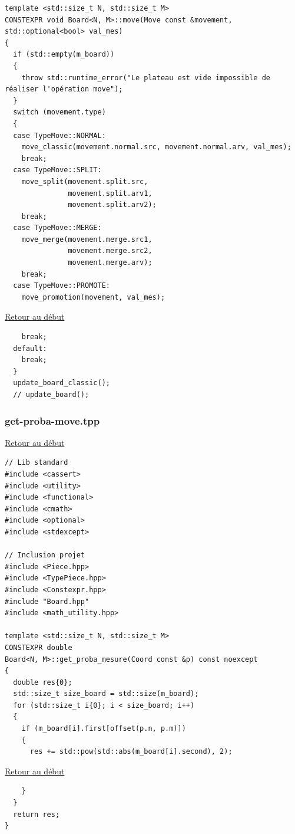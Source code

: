 {\begin{frame}[fragile]
\begin{verbatim}
template <std::size_t N, std::size_t M>
CONSTEXPR void Board<N, M>::move(Move const &movement, std::optional<bool> val_mes)
{
  if (std::empty(m_board))
  {
    throw std::runtime_error("Le plateau est vide impossible de réaliser l'opération move");
  }
  switch (movement.type)
  {
  case TypeMove::NORMAL:
    move_classic(movement.normal.src, movement.normal.arv, val_mes);
    break;
  case TypeMove::SPLIT:
    move_split(movement.split.src,
               movement.split.arv1,
               movement.split.arv2);
    break;
  case TypeMove::MERGE:
    move_merge(movement.merge.src1,
               movement.merge.src2,
               movement.merge.arv);
    break;
  case TypeMove::PROMOTE:
    move_promotion(movement, val_mes);
\end{verbatim}
\end{frame}

\begin{frame}[fragile]
\hyperlink{conclusion}{Retour au début}\newline
\begin{verbatim}
    break;
  default:
    break;
  }
  update_board_classic();
  // update_board();

\end{verbatim}
\end{frame}

\begin{frame}[fragile]
\label{getprobamove.tpp}
\frametitle{get-proba-move.tpp}
\hyperlink{conclusion}{Retour au début}\newline
\begin{verbatim}
// Lib standard
#include <cassert>
#include <utility>
#include <functional>
#include <cmath>
#include <optional>
#include <stdexcept>

// Inclusion projet
#include <Piece.hpp>
#include <TypePiece.hpp>
#include <Constexpr.hpp>
#include "Board.hpp"
#include <math_utility.hpp>

template <std::size_t N, std::size_t M>
CONSTEXPR double
Board<N, M>::get_proba_mesure(Coord const &p) const noexcept
{
  double res{0};
  std::size_t size_board = std::size(m_board);
  for (std::size_t i{0}; i < size_board; i++)
  {
    if (m_board[i].first[offset(p.n, p.m)])
    {
      res += std::pow(std::abs(m_board[i].second), 2);
\end{verbatim}
\end{frame}

\begin{frame}[fragile]
\hyperlink{conclusion}{Retour au début}\newline
\begin{verbatim}
    }
  }
  return res;
}


\end{verbatim}
\end{frame}}
